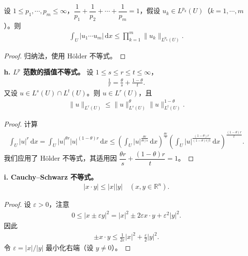 \documentclass[../main.tex]{subfiles}
\begin{document}
\begin{theorem}\label{theorem:广义Holder不等式}
设 $1\leqslant p_1,\cdots,p_m\leqslant\infty$，$\dfrac{1}{p_1}+\dfrac{1}{p_2}+\cdots+\dfrac{1}{p_m}=1$，假设 $u_k\in L^{p_k}(U)$（$k=1,\cdots,m$）。则
\begin{align}
\int_U|u_1\cdots u_m|\,\mathrm{d}x\leqslant\prod_{k=1}^m\|u_k\|_{L^{p_k}(U)}.
\label{align:appB-广义Holder}
\end{align}
\end{theorem}
\begin{proof}
归纳法，使用 H\"older 不等式。
\end{proof}

\textbf{h. $L^p$ 范数的插值不等式。} 设 $1\leqslant s\leqslant r\leqslant t\leqslant\infty$，
\begin{align*}
\frac{1}{r}=\frac{\theta}{s}+\frac{1-\theta}{t}.
\end{align*}
又设 $u\in L^s(U)\cap L^t(U)$。则 $u\in L^r(U)$，且
\begin{align}
\|u\|_{L^r(U)}\leqslant\|u\|_{L^s(U)}^\theta\|u\|_{L^t(U)}^{1-\theta}.
\label{align:appB-插值}
\end{align}
\begin{proof}
计算
\begin{align*}
\int_U|u|^r\,\mathrm{d}x=\int_U|u|^{\theta r}|u|^{(1-\theta)r}\,\mathrm{d}x\leqslant\left(\int_U|u|^{\frac{\theta r}{\theta r/s}}\,\mathrm{d}x\right)^{\frac{\theta r}{s}}\left(\int_U|u|^{\frac{(1-\theta)r}{(1-\theta)r/t}}\,\mathrm{d}x\right)^{\frac{(1-\theta)r}{t}}.
\end{align*}
我们应用了 H\"older 不等式，其适用因 $\dfrac{\theta r}{s}+\dfrac{(1-\theta)r}{t}=1$。
\end{proof}

\textbf{i. Cauchy--Schwarz 不等式。}
\begin{align}
|x\cdot y|\leqslant|x||y| \quad (x,y\in\mathbb{R}^n).
\label{align:appB-CauchySchwarz}
\end{align}
\begin{proof}
设 $\varepsilon>0$，注意
\begin{align*}
0\leqslant|x\pm\varepsilon y|^2=|x|^2\pm 2\varepsilon x\cdot y+\varepsilon^2|y|^2.
\end{align*}
因此
\begin{align*}
\pm x\cdot y\leqslant\frac{1}{2\varepsilon}|x|^2+\frac{\varepsilon}{2}|y|^2.
\end{align*}
令 $\varepsilon=|x|/|y|$ 最小化右端（设 $y\neq 0$）。
\end{proof}
\end{document}
